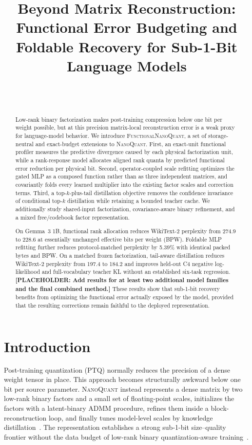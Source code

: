 \documentclass[10pt]{article}
\title{Beyond Matrix Reconstruction: Functional Error Budgeting and\\
Foldable Recovery for Sub-1-Bit Language Models}
\author{\placeholder{Author names}\\
\placeholder{Affiliations}\\
\texttt{\placeholder{Corresponding author email}}}
\date{}
\newcommand{\method}{\textsc{FunctionalNanoQuant}\xspace}
\newcommand{\nq}{\textsc{NanoQuant}\xspace}
\newcommand{\placeholder}[1]{\textcolor{red!70!black}{\textbf{[PLACEHOLDER: #1]}}}
\begin{document}
\maketitle

\begin{abstract}
Low-rank binary factorization makes post-training compression below one bit per
weight possible, but at this precision matrix-local reconstruction error is a
weak proxy for language-model behavior. We introduce \method, a set of
storage-neutral and exact-budget extensions to \nq. First, an exact-unit
functional profiler measures the predictive divergence caused by each physical
factorization unit, while a rank-response model allocates aligned rank quanta by
predicted functional error reduction per physical bit. Second, operator-coupled
scale refitting optimizes the gated MLP as a composed function rather than as
three independent matrices, and covariantly folds every learned multiplier into
the existing factor scales and correction terms. Third, a top-$k$-plus-tail
distillation objective removes the confidence invariance of conditional top-$k$
distillation while retaining a bounded teacher cache. We additionally study
shared-input factorization, covariance-aware binary refinement, and a mixed
free/codebook factor representation.

On Gemma~3 1B, functional rank allocation reduces WikiText-2 perplexity from
274.9 to 228.6 at essentially unchanged effective bits per weight (BPW).
Foldable MLP refitting further reduces protocol-matched perplexity by 5.39\%
with identical packed bytes and BPW. On a matched frozen factorization,
tail-aware distillation reduces WikiText-2 perplexity from 197.4 to 184.2 and
improves held-out C4 negative log-likelihood and full-vocabulary teacher KL
without an established six-task regression. \placeholder{Add results for at
least two additional model families and the final combined method.} These
results show that sub-1-bit recovery benefits from optimizing the functional
error actually exposed by the model, provided that the resulting corrections
remain faithful to the deployed representation.
\end{abstract}

\section{Introduction}

Post-training quantization (PTQ) normally reduces the precision of a dense
weight tensor in place. This approach becomes structurally awkward below one
bit per source parameter. \nq instead represents a dense matrix by two
low-rank binary factors and a small set of floating-point scales, initializes
the factors with a latent-binary ADMM procedure, refines them inside a
block-reconstruction loop, and finally tunes model-level scales by knowledge
distillation~\cite{nanoquant2026}. The representation establishes a strong
sub-1-bit size--quality frontier without the data budget of low-rank binary
quantization-aware training~\cite{littlebit2025,onebit2024}.
\end{document}
